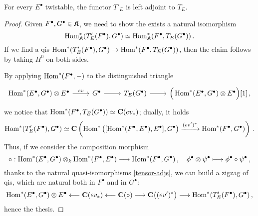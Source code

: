 \begin{lemma}
	For every $E^{\bullet}$ twistable, the functor $T'_{E}$ is left adjoint to $T_{E}$.
	\begin{proof}
		Given $F^{\bullet},G^{\bullet} \in \mathfrak{K}$, 
		we need to show the	exists a natural isomorphism
		\begin{equation*}
			\operatorname{Hom}^{*}_{\mathfrak{K}}(T'_{E}(F^{\bullet}),G^{\bullet}) 
			\simeq \operatorname{Hom}^{*}_{\mathfrak{K}}(F^{\bullet},T_{E}(G^{\bullet}))\,.
		\end{equation*}
		If we find a qis $\operatorname{Hom}^{*}(T'_{E}(F^{\bullet}),G^{\bullet}) 
		\to \operatorname{Hom}^{*}(F^{\bullet},T_{E}(G^{\bullet}))$,
		then the claim follows by taking $H^{0}$ on both sides.
			
		By applying $\operatorname{Hom}^{*}(F^{\bullet},-)$ to the distinguished triangle
		\begin{equation*}
			\begin{tikzcd}
			\Hom^{*}(E^{\bullet},G^{\bullet}) \otimes E^{\bullet} \ar[r, "ev"]
			& G^{\bullet} \ar[r]
			& T_{E}(G^{\bullet}) \ar[r]
			& \Big( \Hom^{*}(E^{\bullet},G^{\bullet}) \otimes E^{\bullet} \Big){[1]}\,,
			\end{tikzcd}
		\end{equation*}
		we notice that $\operatorname{Hom}^{*}(F^{\bullet},T_{E}(G^{\bullet})) \simeq {\normalfont\textbf{C}}(ev_{*})$;
		dually, it holds
		\begin{equation*}
			\operatorname{Hom}^{*}(T'_{E}(F^{\bullet}),G^{\bullet}) \simeq 
			{\normalfont\textbf{C}}\left( \operatorname{Hom}^{*} \big([\operatorname{Hom}^{*}(F^{\bullet},E^{\bullet}),E^{\bullet}],G^{\bullet} \big)
			\xrightarrow{(ev')^{*}} \operatorname{Hom}^{*}(F^{\bullet},G^{\bullet}) \right)\,.
		\end{equation*}
		Thus, if we consider the composition morphism
		\begin{equation*}
			\circ : \Hom^{*}(E^{\bullet},G^{\bullet}) \otimes_{k} \Hom^{*}(F^{\bullet},E^{\bullet})
			\longrightarrow \Hom^{*}(F^{\bullet},G^{\bullet})\,, \quad
			\phi^{\bullet} \otimes \psi^{\bullet} \longmapsto \phi^{\bullet} \circ \psi^{\bullet}\,,
		\end{equation*}
		thanks to the natural quasi-isomorphisms \eqref{tensor-adjs},
		we can build a zigzag of qis, which are natural both in $F^{\bullet}$ and in $G^{\bullet}$:
		\begin{equation*}
			\operatorname{Hom}^{*}(E^{\bullet},G^{\bullet}) \otimes E^{\bullet}
			\longleftarrow {\normalfont\textbf{C}}(ev_{*})
			\longleftarrow {\normalfont\textbf{C}}(\circ)
			\longrightarrow {\normalfont\textbf{C}}\big( (ev')^{*} \big)
			\longrightarrow \operatorname{Hom}^{*}(T'_{E}(F^{\bullet}),G^{\bullet})\,,
		\end{equation*}
		hence the thesis.
	\end{proof}
\end{lemma}



